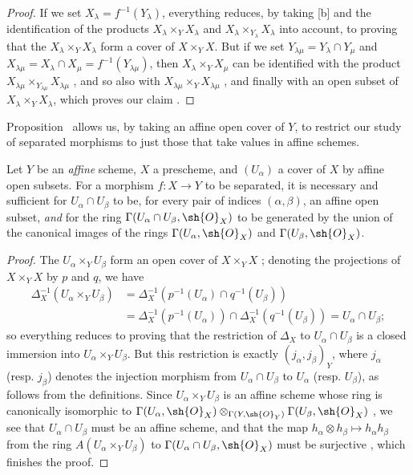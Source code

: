 \begin{proof}
If we set $X_\lambda=f^{-1}(Y_\lambda)$, everything reduces, by taking [b] and the identification of the products $X_\lambda\times_Y X_\lambda$ and $X_\lambda\times_{Y_\lambda}X_\lambda$ into account, to proving that the $X_\lambda\times_Y X_\lambda$ form a cover of $X\times_Y X$.
But if we set $Y_{\lambda\mu}=Y_\lambda\cap Y_\mu$ and $X_{\lambda\mu}=X_\lambda\cap X_\mu=f^{-1}(Y_{\lambda\mu})$, then $X_\lambda\times_Y X_\mu$ can be identified with the product $X_{\lambda\mu}\times_{Y_{\lambda\mu}}X_{\lambda\mu}$ , and so also with $X_{\lambda\mu}\times_Y X_{\lambda\mu}$ , and finally with an open subset of $X_\lambda\times_Y X_\lambda$, which proves our claim .
\end{proof}

Proposition~ allows us, by taking an affine open cover of $Y$, to restrict our study of separated morphisms to just those that take values in affine schemes.

\begin{proposition}[5.5.6]
\label{I.5.5.6}
Let $Y$ be an \emph{affine} scheme, $X$ a prescheme, and $(U_\alpha)$ a cover of $X$ by affine open subsets.
For a morphism $f:X\to Y$ to be separated, it is necessary and sufficient for $U_\alpha\cap U_\beta$ to be, for every pair of indices $(\alpha,\beta)$, an affine open subset, \emph{and} for the ring $\Gamma(U_\alpha\cap U_\beta,\sh{O}_X)$ to be generated by the union of the canonical images of the rings $\Gamma(U_\alpha,\sh{O}_X)$ and $\Gamma(U_\beta,\sh{O}_X)$.
\end{proposition}

\begin{proof}
The $U_\alpha\times_Y U_\beta$ form an open cover of $X\times_Y X$ ;
denoting the projections of $X\times_Y X$ by $p$ and $q$, we have
\begin{align*}
  \Delta_X^{-1}(U_\alpha\times_Y U_\beta)&=\Delta_X^{-1}(p^{-1}(U_\alpha)\cap q^{-1}(U_\beta))\\
                                         &=\Delta_X^{-1}(p^{-1}(U_\alpha))\cap\Delta_X^{-1}(q^{-1}(U_\beta))=U_\alpha\cap U_\beta;
\end{align*}
so everything reduces to proving that the restriction of $\Delta_X$ to $U_\alpha\cap U_\beta$ is a closed immersion into $U_\alpha\times_Y U_\beta$.
But this restriction is exactly $(j_\alpha,j_\beta)_Y$, where $j_\alpha$ (resp. $j_\beta$) denotes the injection morphism from $U_\alpha\cap U_\beta$ to $U_\alpha$ (resp. $U_\beta$), as follows from the definitions.
Since $U_\alpha\times_Y U_\beta$ is an affine scheme whose ring is canonically isomorphic to $\Gamma(U_\alpha,\sh{O}_X)\otimes_{\Gamma(Y,\sh{O}_Y)}\Gamma(U_\beta,\sh{O}_X)$ , we see that $U_\alpha\cap U_\beta$ must be an affine scheme, and that the map $h_\alpha\otimes h_\beta\mapsto h_\alpha h_\beta$ from the ring $A(U_\alpha\times_Y U_\beta)$ to $\Gamma(U_\alpha\cap U_\beta,\sh{O}_X)$ must be surjective , which finishes the proof.
\end{proof}

